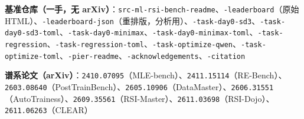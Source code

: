 \textbf{基准仓库（一手，无 arXiv）}：\texttt{src-ml-rsi-bench-readme}、\texttt{-leaderboard}（原始 HTML）、\texttt{-leaderboard-json}（重排版，分析用）、\texttt{-task-day0-sd3}、\texttt{-task-day0-sd3-toml}、\texttt{-task-day0-minimax}、\texttt{-task-day0-minimax-toml}、\texttt{-task-regression}、\texttt{-task-regression-toml}、\texttt{-task-optimize-qwen}、\texttt{-task-optimize-toml}、\texttt{-pier-readme}、\texttt{-acknowledgements}、\texttt{-citation}


\textbf{谱系论文（arXiv）}：\texttt{2410.07095}（MLE-bench）、\texttt{2411.15114}（RE-Bench）、\texttt{2603.08640}（PostTrainBench）、\texttt{2605.10906}（DataMaster）、\texttt{2606.31551}（AutoTrainess）、\texttt{2609.35561}（RSI-Master）、\texttt{2611.03698}（RSI-Dojo）、\texttt{2611.06263}（CLEAR）

